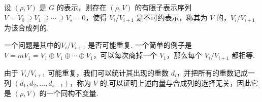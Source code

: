 \begin{definition}[合成列]
    设 $(\rho, V)$ 是 $G$ 的表示，则存在 $(\rho, V)$ 的有限子表示序列 $V = V_0 \supseteq V_1 \supseteq \cdots \supseteq V_s = 0$，使得 $V_i / V_{i+1}$ 是不可约表示，称其为 $V$ 的，$V_i / V_{i+1}$ 为该合成列的.
\end{definition}

一个问题是其中的$V_i / V_{i+1}$ 是否可能重复. 一个简单的例子是 $V = m V_1 = V_1 \oplus V_1 \oplus \cdots \oplus V_1$，可以每次商掉一个 $V_1$，那么每个 $V_i / V_{i+1}$ 都相等.\par
由于 $V_i / V_{i+1}$ 可能重复，我们可以统计其出现的重数 $d_i$，并把所有的重数记成一列 $(d_1, d_2, \dots, d_{s-1})$，称为 $V$ 的.可以证明上述向量与合成列的选择无关，因此它是 $(\rho, V)$ 的一个同构不变量.

